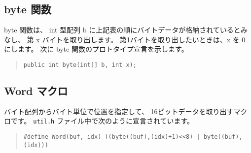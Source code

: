 \subsection{byte 関数}

byte 関数は、
int 型配列 b に上記表の順にバイトデータが格納されているとみなし、
第 x バイトを取り出します。
第1バイトを取り出したいときは、x を 0 にします。
次に byte 関数のプロトタイプ宣言を示します。

\begin{quote}
\begin{verbatim}
public int byte(int[] b, int x); 
\end{verbatim}
\end{quote}

\subsection{Word マクロ}

バイト配列からバイト単位で位置を指定して、
16ビットデータを取り出すマクロです。
\verb/util.h/ ファイル中で次のように宣言されています。

\begin{quote}
\begin{verbatim}
#define Word(buf, idx) ((byte((buf),(idx)+1)<<8) | byte((buf),(idx)))
\end{verbatim}
\end{quote}
